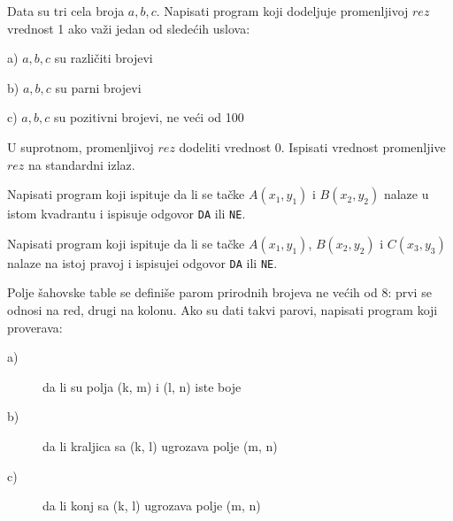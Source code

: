 \begin{Exercise}[label=p1_18]
Data su tri cela broja $a, b, c$. Napisati program koji dodeljuje promenljivoj $rez$ vrednost 1
ako važi jedan od sledećih uslova:
\begin{description}
\item{a)} $a, b, c$ su različiti brojevi
\item{b)} $a, b, c$ su parni brojevi
\item{c)} $a, b, c$ su pozitivni brojevi, ne veći od 100
\end{description}
U suprotnom, promenljivoj $rez$ dodeliti vrednost 0. Ispisati vrednost promenljive $rez$ na standardni izlaz. \\
\end{Exercise}
\begin{Answer}[ref=p1_18]
\end{Answer}

\begin{Exercise}[label=p1_19]
Napisati program koji ispituje da li se ta\v cke $A(x_1, y_1)$ i $B(x_2,
y_2)$ nalaze u istom kvadrantu i ispisuje odgovor
\verb|DA| ili \verb|NE|. \\
\end{Exercise}
\begin{Answer}[ref=p1_19]
\end{Answer}

\begin{Exercise}[label=p1_20]
Napisati program koji ispituje da li se ta\v cke $A(x_1, y_1)$, $B(x_2,
y_2)$ i $C(x_3, y_3)$ nalaze na istoj pravoj i
ispisujei odgovor \verb|DA| ili \verb|NE|. \\
\end{Exercise}
\begin{Answer}[ref=p1_20]
\end{Answer}

\begin{Exercise}[label=p1_21]
Polje \v sahovske table se defini\v se parom prirodnih brojeva ne ve\'
cih od 8: prvi se odnosi na red, drugi na kolonu. Ako su dati takvi
parovi, napisati program koji proverava: \\
\begin{description}
\item[a)] da li su polja (k, m) i (l, n) iste boje
\item[b)] da li kraljica sa (k, l) ugrozava polje (m, n)
\item[c)] da li konj sa (k, l) ugrozava polje (m, n)
\end{description}
\end{Exercise}
\begin{Answer}[ref=p1_21]
\end{Answer}


